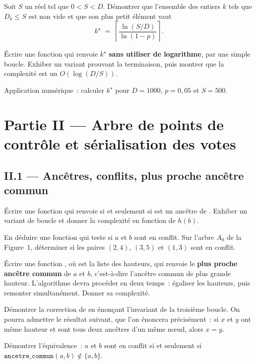 \documentclass[11pt,a4paper]{article}
\begin{document}
\Q Soit $S$ un réel tel que $0<S<D$. Démontrer que l'ensemble des entiers $k$ tels que
$D_k\le S$ est non vide et que son plus petit élément vaut
\[ k^{\star} \;=\; \left\lceil \frac{\ln(S/D)}{\ln(1-p)} \right\rceil . \]

\Q Écrire une fonction  qui renvoie $k^{\star}$ \textbf{sans
utiliser de logarithme}, par une simple boucle. Exhiber un variant prouvant la terminaison,
puis montrer que la complexité est un $O\!\left(\log(D/S)\right)$.

\Q Application numérique~: calculer $k^{\star}$ pour $D=1000$, $p=0{,}05$ et $S=500$.

\section*{Partie II --- Arbre de points de contrôle et sérialisation des votes}

\subsection*{II.1 --- Ancêtres, conflits, plus proche ancêtre commun}

\Q Écrire une fonction  qui renvoie  si et
seulement si  est un ancêtre de . Exhiber un variant de boucle et donner la
complexité en fonction de $h(b)$.

\Q En déduire une fonction  qui teste si $a$ et $b$ sont en
conflit. Sur l'arbre $A_0$ de la Figure~1, déterminer si les paires $(2,4)$, $(3,5)$ et
$(1,3)$ sont en conflit.

\Q Écrire une fonction , où  est la liste des
hauteurs, qui renvoie le \textbf{plus proche ancêtre commun} de $a$ et $b$, c'est-à-dire
l'ancêtre commun de plus grande hauteur. L'algorithme devra procéder en deux temps~: égaliser
les hauteurs, puis remonter simultanément. Donner sa complexité.

\Q Démontrer la correction de  en énonçant l'invariant de la troisième
boucle. On pourra admettre le résultat suivant, que l'on énoncera précisément~: si $x$ et
$y$ ont même hauteur et sont tous deux ancêtres d'un même n\oe ud, alors $x=y$.

\Q Démontrer l'équivalence~: $a$ et $b$ sont en conflit si et seulement si
$\texttt{ancetre\_commun}(a,b)\notin\{a,b\}$.
\end{document}
